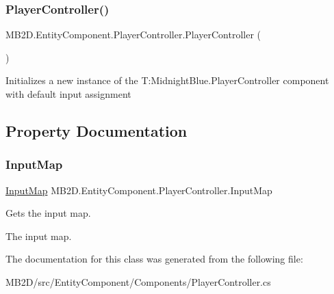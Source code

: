 \subsubsection{\texorpdfstring{Player\+Controller()}{PlayerController()}}
{\footnotesize\ttfamily M\+B2\+D.\+Entity\+Component.\+Player\+Controller.\+Player\+Controller (\begin{DoxyParamCaption}{ }\end{DoxyParamCaption})\hspace{0.3cm}{\ttfamily [inline]}}



Initializes a new instance of the T\+:\+Midnight\+Blue.\+Player\+Controller component with default input assignment 



\subsection{Property Documentation}
\hypertarget{class_m_b2_d_1_1_entity_component_1_1_player_controller_a5fd930f90d72b416721ac93d9a81bc6d}{}\label{class_m_b2_d_1_1_entity_component_1_1_player_controller_a5fd930f90d72b416721ac93d9a81bc6d} 
\subsubsection{\texorpdfstring{Input\+Map}{InputMap}}
{\footnotesize\ttfamily \hyperlink{class_m_b2_d_1_1_i_o_1_1_input_map}{Input\+Map} M\+B2\+D.\+Entity\+Component.\+Player\+Controller.\+Input\+Map\hspace{0.3cm}{\ttfamily [get]}}



Gets the input map. 

The input map.

The documentation for this class was generated from the following file\+:\begin{DoxyCompactItemize}
\item 
M\+B2\+D/src/\+Entity\+Component/\+Components/Player\+Controller.\+cs\end{DoxyCompactItemize}
